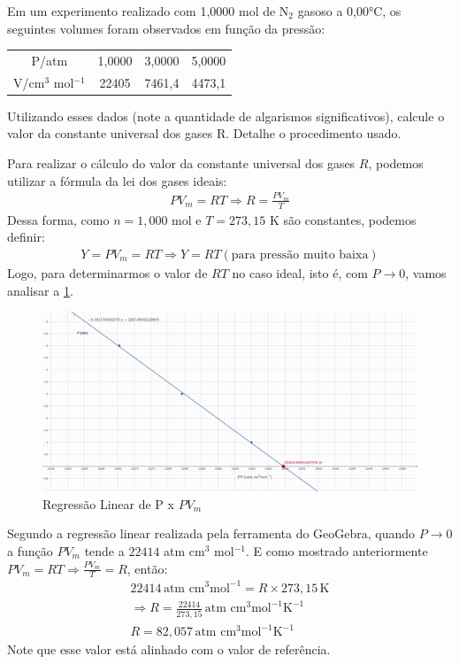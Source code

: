 \begin{xcs}
    Em um experimento realizado com 1,0000 mol de N\(_2\) gasoso a 0,00°C, os
    seguintes volumes foram observados em função da pressão: 
    \begin{center}
    \begin{tabular}{c | c c c}
    \hline
        P/atm & 1,0000 & 3,0000 & 5,0000\\
        V/cm\(^3\) mol\(^{-1}\) & 22405 & 7461,4 & 4473,1\\
    \hline
    \end{tabular}
    \end{center}
    Utilizando esses dados (note a quantidade de algarismos significativos),
    calcule o valor da constante universal dos gases R. Detalhe o procedimento
    usado.
\end{xcs}
\begin{rsl}
    
    Para realizar o cálculo do valor da constante universal dos gases \( R \),
    podemos utilizar a fórmula da lei dos gases ideais: 
    \begin{align*}
        PV_m = RT \Rightarrow R = \frac{PV_m}{T}
    \end{align*}
    Dessa forma, como \( n = 1,000 \) mol e \( T = 273,15 \) K são constantes,
    podemos definir:
    \begin{align*}
        Y = PV_m = RT \Rightarrow Y = RT (\text{para pressão
        muito baixa})
    \end{align*}
    Logo, para determinarmos o valor de \( RT \) no caso ideal, 
    isto é, com \( P \to 0 \), vamos analisar a \cref{reggeo}.

    \begin{figure}[H]
        \centering
        \includegraphics[width=.5\linewidth]{images/graficogeogebra.png}
        \caption{Regressão Linear de P x \(PV_m\)}
        \label{reggeo}
    \end{figure}

    Segundo a regressão linear realizada pela ferramenta do GeoGebra, quando \(
    P \to 0 \) a função \( PV_m \) tende a \( 22414 \) atm cm\(^3\)
    mol\(^{-1}\). 
    E como mostrado anteriormente \( PV_m = RT \Rightarrow
    \frac{PV_m}{T} = R \), então:
    \begin{align*}
        22414 \, \text{atm cm}^3 \text{mol}^{-1} = R \times 273,15 \, \text{K}\\
        \Rightarrow R = \frac{22414}{273,15} \, \text{atm cm}^3
        \text{mol}^{-1} \text{K}^{-1}\\
        R = 82,057 \, \text{atm cm}^3 \text{mol}^{-1} \text{K}^{-1}
    \end{align*}
    Note que esse valor está alinhado com o valor de referência.
    
\end{rsl}
